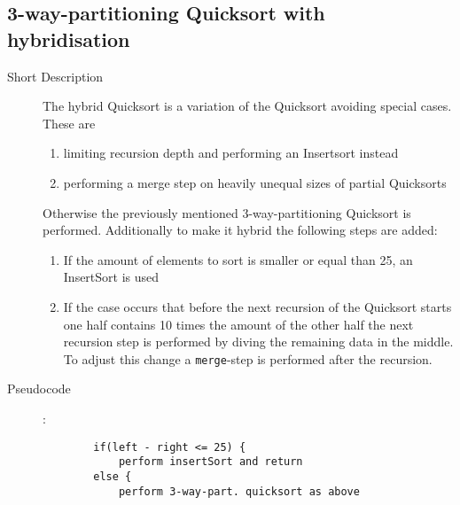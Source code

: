 \documentclass[11pt]{amsart}
\begin{document}
\subsection{3-way-partitioning Quicksort with hybridisation}
\begin{description}
	\item[Short Description] The hybrid Quicksort is a variation of the Quicksort avoiding special cases. These are
	\begin{enumerate}
		\item limiting recursion depth and performing an Insertsort instead
		\item performing a merge step on heavily unequal sizes of partial Quicksorts
	\end{enumerate}
Otherwise the previously mentioned 3-way-partitioning Quicksort is performed. Additionally to make it hybrid the following steps are added:
		\begin{enumerate}
			\item If the amount of elements to sort is smaller or equal than 25, an InsertSort is used
			\item If the case occurs that before the next recursion of the Quicksort starts one half contains 10 times the amount of the other half the next recursion step is performed by diving the remaining data in the middle. To adjust this change a \texttt{merge}-step is performed after the recursion.
		\end{enumerate}
	\item[Pseudocode]:
		\begin{lstlisting}
		if(left - right <= 25) {
			perform insertSort and return
		else {
			perform 3-way-part. quicksort as above
			

\end{lstlisting}
\end{description}
\end{document}
